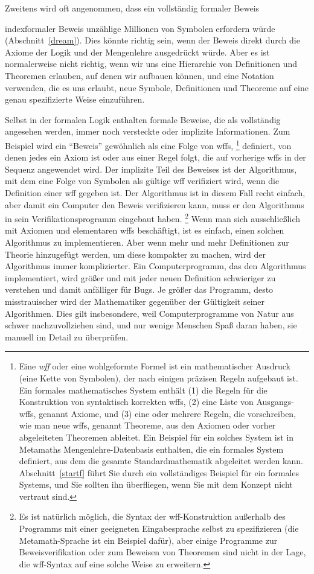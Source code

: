 Zweitens wird oft angenommen, dass ein vollständig formaler Beweis {index{formaler Beweis} unzählige Millionen von Symbolen erfordern würde (Abschnitt~\ref{dream}). Dies könnte richtig sein, wenn der Beweis direkt durch die Axiome der Logik und der Mengenlehre ausgedrückt würde.  Aber es ist normalerweise nicht richtig, wenn wir uns
eine Hierarchie von Definitionen und Theoremen erlauben, auf denen wir aufbauen können, und eine Notation verwenden, die es uns erlaubt, neue Symbole, Definitionen und Theoreme auf eine genau spezifizierte Weise einzuführen.

Selbst in der formalen Logik enthalten formale Beweise, die als vollständig angesehen werden, immer noch versteckte oder implizite Informationen.
Zum Beispiel wird ein "`Beweis"' gewöhnlich als eine Folge von wffs,
\footnote{Eine {\em wff} oder eine wohlgeformte Formel ist ein mathematischer Ausdruck (eine Kette von Symbolen), der nach einigen präzisen Regeln aufgebaut ist.  Ein formales mathematisches System enthält (1) die Regeln für die Konstruktion von syntaktisch korrekten wffs, (2) eine Liste von Ausgangs-wffs, genannt Axiome,  und (3) eine oder mehrere Regeln, die vorschreiben, wie man neue wffs, genannt Theoreme, aus den Axiomen oder vorher abgeleiteten Theoremen ableitet.  Ein Beispiel für ein solches System ist in Metamaths Mengenlehre-Datenbasis enthalten, die ein formales System definiert, aus dem die gesamte Standardmathematik abgeleitet werden kann.
Abschnitt~\ref{startf} führt Sie durch ein vollständiges Beispiel für ein formales Systems, und Sie sollten ihn überfliegen, wenn Sie mit dem Konzept nicht vertraut sind.}
definiert, von denen jedes ein Axiom ist oder aus einer Regel folgt, die auf vorherige wffs in der Sequenz angewendet wird.  Der implizite Teil des Beweises ist der Algorithmus, mit dem eine Folge von Symbolen als gültige wff verifiziert wird, wenn die Definition einer wff gegeben ist.  Der Algorithmus ist in diesem Fall recht einfach, aber damit ein Computer den Beweis verifizieren kann, muss er den Algorithmus in sein Verifikationsprogramm eingebaut haben.
\footnote{Es ist natürlich möglich, die Syntax der wff-Konstruktion außerhalb des Programms mit einer geeigneten Eingabesprache selbst zu spezifizieren (die Metamath-Sprache ist ein Beispiel dafür), aber einige Programme zur Beweisverifikation oder zum Beweisen von Theoremen sind nicht in der Lage, die wff-Syntax auf eine solche Weise zu erweitern.}
Wenn man sich ausschließlich mit Axiomen und elementaren wffs beschäftigt, ist es einfach, einen solchen Algorithmus zu implementieren.  Aber wenn mehr und mehr Definitionen zur Theorie hinzugefügt werden, um diese kompakter zu machen, wird der Algorithmus immer komplizierter.
Ein Computerprogramm, das den Algorithmus implementiert, wird größer und mit jeder neuen Definition schwieriger zu verstehen und damit anfälliger für Bugs.  Je größer das Programm, desto misstrauischer wird der Mathematiker gegenüber der Gültigkeit seiner Algorithmen.  Dies gilt insbesondere, weil Computerprogramme von Natur aus schwer nachzuvollziehen sind, und nur wenige Menschen Spaß daran haben, sie manuell im Detail zu überprüfen.

}

